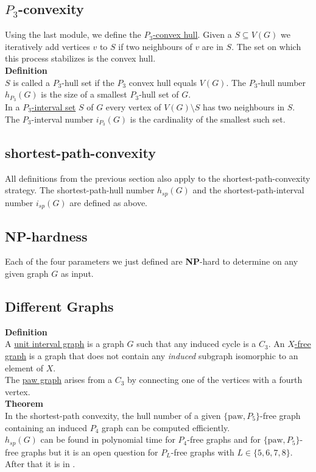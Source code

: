 \documentclass[a4paper, 12pt]{article}
\begin{document}
	\subsection{$P_3$-convexity}
	Using the last module, we define the \underline{$P_3$-convex hull}. Given a $S \subseteq V(G)$ we iteratively add vertices $v$ to $S$ if two neighbours of $v$ are in $S$. The set on which this process stabilizes is the convex hull.\\
	\textbf{Definition}\\
	$S$ is called a $P_3$-hull set if the $P_3$ convex hull equals $V(G)$. The $P_3$-hull number $h_{P_3}(G)$ is the size of a smallest $P_3$-hull set of $G$.\\
	In a \underline{$P_3$-interval set} $S$ of $G$ every vertex of $V(G)\setminus S$ has two neighbours in $S$. The $P_3$-interval number $i_{P_3}(G)$ is the cardinality of the smallest such set.
	
	\subsection{shortest-path-convexity}
	All definitions from the previous section also apply to the shortest-path-convexity strategy. The shortest-path-hull number $h_{sp}(G)$ and the shortest-path-interval number $i_{sp}(G)$ are defined as above.
	
	\subsection{NP-hardness}
	Each of the four parameters we just defined are \textbf{NP}-hard to determine on any given graph $G$ as input.
	
	\subsection{Different Graphs}
	\textbf{Definition}\\
	A \underline{unit interval graph} is a graph $G$ such that any induced cycle is a $C_3$.
	An \underline{$X$-free graph} is a graph that does not contain any \textit{induced} subgraph isomorphic to an element of $X$.\\
	The \underline{paw graph} arises from a $C_3$ by connecting one of the vertices with a fourth vertex.\\
	\textbf{Theorem}\\
	In the shortest-path convexity, the hull number of a given $\{\text{paw}, P_5\}$-free graph containing an induced $P_4$ graph can be computed efficiently.\\
	
	$h_{sp}(G)$ can be found in polynomial time for $P_4$-free graphs and for $\{\text{paw}, P_5\}$-free graphs but it is an open question for $P_L$-free graphs with $L \in \{5,6,7,8\}$. After that it is in .
\end{document}
